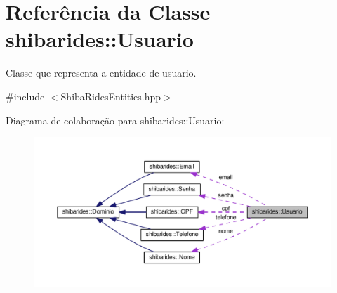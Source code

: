 \hypertarget{classshibarides_1_1Usuario}{}\section{Referência da Classe shibarides\+:\+:Usuario}
\label{classshibarides_1_1Usuario}


Classe que representa a entidade de usuario.  




{\ttfamily \#include $<$Shiba\+Rides\+Entities.\+hpp$>$}



Diagrama de colaboração para shibarides\+:\+:Usuario\+:\nopagebreak
\begin{figure}[H]
\begin{center}
\leavevmode
\includegraphics[width=350pt]{classshibarides_1_1Usuario__coll__graph}
\end{center}
\end{figure}
